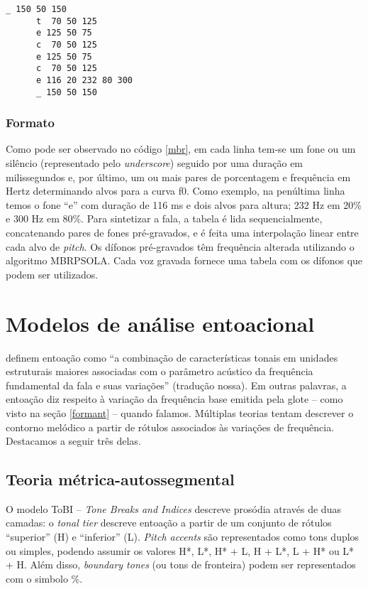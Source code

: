 \begin{lstlisting}[caption=Exemplo de arquivo de entrada para MBROLA, label=mbr]
      _ 150 50 150
      t  70 50 125
      e 125 50 75
      c  70 50 125
      e 125 50 75
      c  70 50 125
      e 116 20 232 80 300
      _ 150 50 150
\end{lstlisting}

\subsubsection{Formato}
Como pode ser observado no código \ref{mbr}, em cada linha tem-se um fone ou um
silêncio (representado pelo \emph{underscore}) seguido por uma duração em
milissegundos e, por último, um ou mais pares de porcentagem e frequência em
Hertz determinando alvos para a curva f0. Como exemplo, na penúltima linha temos
o fone ``e'' com duração de 116 ms e dois alvos para altura; 232 Hz em 20\% e
300 Hz em 80\%. Para sintetizar a fala, a tabela é lida sequencialmente,
concatenando pares de fones pré-gravados, e é feita uma interpolação linear
entre cada alvo de \emph{pitch}. Os dífonos pré-gravados têm frequência alterada
utilizando o algoritmo MBRPSOLA. Cada voz gravada fornece uma tabela com os dífonos que podem ser utilizados. 

\section{Modelos de análise entoacional}
\label{entoa}

 definem entoação como ``a combinação de características
tonais em unidades estruturais maiores associadas com o parâmetro acústico da
frequência fundamental da fala e suas variações'' (tradução nossa). Em outras
palavras, a entoação diz respeito à variação da frequência base emitida pela
glote -- como visto na seção \ref{formant} -- quando falamos. Múltiplas teorias
tentam descrever o contorno melódico a partir de rótulos associados às variações
de frequência. Destacamos a seguir três delas.

\subsection{Teoria métrica-autossegmental}
O modelo ToBI -- \emph{Tone Breaks and Indices} \cite{tobi} descreve prosódia
através de duas camadas: o \emph{tonal tier} descreve entoação a partir de um
conjunto de rótulos ``superior'' (H) e ``inferior'' (L). \emph{Pitch accents}
são representados como tons duplos ou simples, podendo assumir os valores H*, L*, H* + L, H + L*, L + H* ou L* + H. Além disso,
\emph{boundary tones} (ou tons de fronteira) podem ser representados com o simbolo \%.

